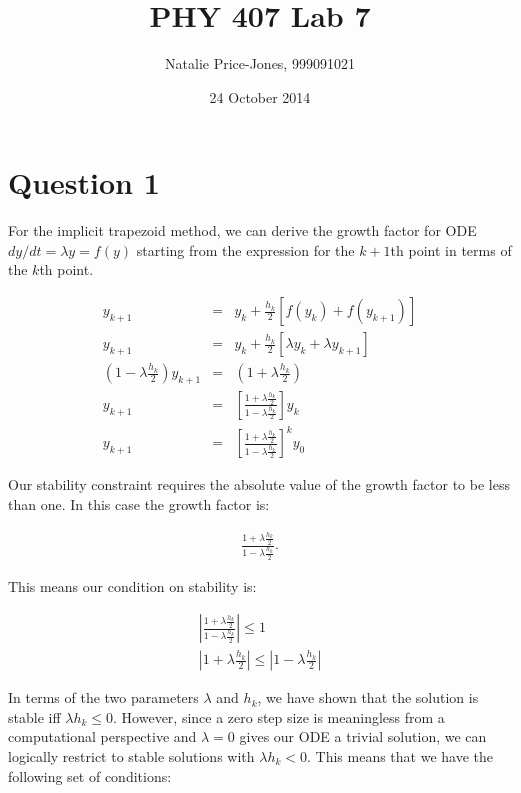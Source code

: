 \documentclass[a4paper,12pt]{article}
\begin{document}
\onehalfspacing
\title{PHY 407 Lab 7}
\author{Natalie Price-Jones, 999091021}
\date{24 October 2014}
\maketitle

\section{Question 1}

For the implicit trapezoid method, we can derive the growth factor for ODE $dy/dt = \lambda y = f(y)$ starting from the expression for the $k + 1$th point in terms of the $k$th point.

\begin{eqnarray}
y_{k+1} &=& y_k + \frac{h_k}{2}[f(y_k) + f(y_{k+1})]\nonumber\\
y_{k+1} &=& y_k + \frac{h_k}{2}[\lambda y_k + \lambda y_{k+1}]\nonumber\\
\left(1 - \lambda \frac{h_k}{2}\right) y_{k+1} &=& \left(1 + \lambda\frac{h_k}{2}\right)\nonumber\\
y_{k+1} &=& \left[\frac{1 + \lambda\frac{h_k}{2}}{1 - \lambda\frac{h_k}{2}}\right]y_k\nonumber\\
y_{k+1} &=& \left[\frac{1 + \lambda\frac{h_k}{2}}{1 - \lambda\frac{h_k}{2}}\right]^k y_0\nonumber
\end{eqnarray}

Our stability constraint requires the absolute value of the growth factor to be less than one. In this case the growth factor is:

\begin{eqnarray}
\frac{1 + \lambda\frac{h_k}{2}}{1 - \lambda\frac{h_k}{2}}.\nonumber
\end{eqnarray}

This means our condition on stability is:

\begin{eqnarray}
\label{eqn:growth}
\left|\frac{1 + \lambda\frac{h_k}{2}}{1 - \lambda\frac{h_k}{2}}\right| \leq 1\\
\left|1 + \lambda\frac{h_k}{2}\right| \leq \left|1 - \lambda\frac{h_k}{2}\right|\nonumber
\end{eqnarray}

In terms of the two parameters $\lambda$ and $h_k$, we have shown that the solution is stable iff $\lambda h_k\leq 0$. However, since a zero step size is meaningless from a computational perspective and $\lambda = 0$ gives our ODE a trivial solution, we can logically restrict to stable solutions with $\lambda h_k < 0$. This means that we have the following set of conditions:
\end{document}
